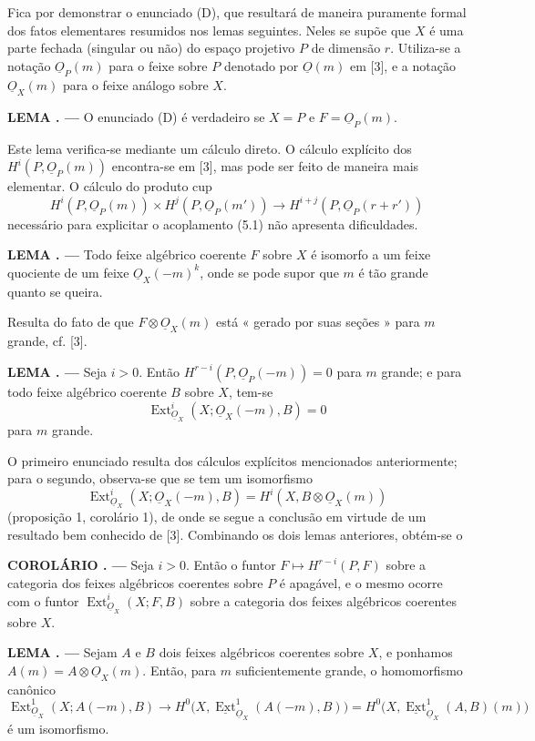 \documentclass[11pt,twoside,openany]{book}
\numberwithin{equation}{section}
\newcommand{\src}[1]{%
  \phantomsection\hypertarget{src:#1}{}%
  \marginpar{\raggedleft\footnotesize\sffamily #1}%
}
\newcommand{\Osh}{\underline{O}}
\newcommand{\Extsh}{\underline{\operatorname{Ext}}}
\theoremstyle{plain}
\theoremstyle{definition}
\theoremstyle{remark}
\newcommand{\result}[2]{%
  \par\medskip\noindent\textbf{#1%
  \if\relax\detokenize{#2}\relax\else\space#2\fi. ---}\enspace
}
\newcommand{\FgaUnitKey}{frontmatter}
\renewcommand{\src}[1]{%
  \phantomsection\hypertarget{src:\FgaUnitKey:#1}{}%
  \marginpar{\raggedleft\footnotesize\sffamily #1}%
}
\begin{document}
Fica por demonstrar o enunciado (D), que resultará de maneira puramente formal dos fatos
elementares resumidos nos lemas seguintes. Neles se supõe que $X$ é uma
parte fechada (singular ou não) do espaço projetivo $P$ de dimensão $r$.
Utiliza-se a notação $\Osh_P(m)$ para o feixe sobre $P$ denotado por $\Osh(m)$ em
[3], e a notação $\Osh_X(m)$ para o feixe análogo sobre $X$.

\result{LEMA}{2} O enunciado (D) é verdadeiro se $X=P$ e $F=\Osh_P(m)$.

Este lema verifica-se mediante um cálculo direto. O cálculo explícito dos
$H^{i}(P,\Osh_P(m))$ encontra-se em [3], mas pode ser feito de maneira mais
elementar. O cálculo do produto cup
\[
  H^{i}(P,\Osh_P(m))\times H^{j}(P,\Osh_P(m'))
  \longrightarrow H^{i+j}(P,\Osh_P(r+r'))
\]
necessário para explicitar o acoplamento (5.1) não apresenta
dificuldades.

\result{LEMA}{3} Todo feixe algébrico coerente $F$ sobre $X$ é isomorfo a
um feixe quociente de um feixe $\Osh_X(-m)^{k}$, onde se pode supor que $m$ é
tão grande quanto se queira.

Resulta do fato de que $F\otimes\Osh_X(m)$ está « gerado por suas seções » para
$m$ grande, cf. [3].

\result{LEMA}{4} Seja $i>0$. Então
$H^{r-i}(P,\Osh_P(-m))=0$ para $m$ grande; e para todo feixe algébrico
coerente $B$ sobre $X$, tem-se
\[
  \operatorname{Ext}_{\Osh_X}^{i}(X;\Osh_X(-m),B)=0
\]
para $m$ grande.

O primeiro enunciado resulta dos cálculos explícitos mencionados anteriormente; para o
segundo, observa-se que se tem um isomorfismo
\[
  \operatorname{Ext}_{\Osh_X}^{i}(X;\Osh_X(-m),B)
  =H^{i}(X,B\otimes\Osh_X(m))
\]
(proposição 1, corolário 1), de onde se segue a conclusão em virtude de um resultado bem
conhecido de [3]. Combinando os dois lemas anteriores, obtém-se o

\result{COROLÁRIO}{} Seja $i>0$. Então o funtor
$F\longmapsto H^{r-i}(P,F)$ sobre a categoria dos feixes algébricos coerentes
sobre $P$ é apagável, e o mesmo ocorre com o funtor
$\operatorname{Ext}_{\Osh_X}^{i}(X;F,B)$ sobre a categoria dos feixes
algébricos coerentes sobre $X$.

\src{184}
\result{LEMA}{5} Sejam $A$ e $B$ dois feixes algébricos coerentes sobre
$X$, e ponhamos $A(m)=A\otimes\Osh_X(m)$. Então, para $m$ suficientemente grande,
o homomorfismo canônico
\[
  \operatorname{Ext}_{\Osh_X}^{1}(X;A(-m),B)
  \longrightarrow H^{0}\bigl(X,\Extsh_{\Osh_X}^{1}(A(-m),B)\bigr)
  =H^{0}\bigl(X,\Extsh_{\Osh_X}^{1}(A,B)(m)\bigr)
\]
é um isomorfismo.
\end{document}

